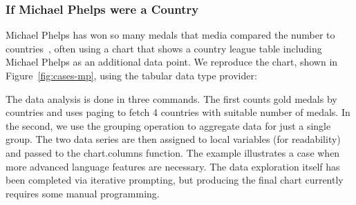 \documentclass[manuscript,review,anonymous]{acmart}
\newcommand{\kvd}[1]{\textbf{#1}}
\newcommand{\ikvd}[1]{{\fontfamily{zi4}\selectfont\small #1}}
\begin{document}
\subsubsection*{If Michael Phelps were a Country}
Michael Phelps has won so many medals that media compared the number to
countries~\cite{phelps}, often using a chart that shows a country league table including Michael Phelps
as an additional data point.
We reproduce the chart, shown in Figure~\ref{fig:cases-mp}, using the tabular data type provider:
%
%
The data analysis is done in three commands. The first counts gold medals by countries
and uses paging to fetch 4 countries with suitable number of medals. In the second, we use the
grouping operation to aggregate data for just a single group. The two data series are then assigned
to local variables (for readability) and passed to the \ikvd{chart.columns} function.
The example illustrates a case when more advanced language features are necessary. The data exploration
itself has been completed via iterative prompting, but producing the final chart currently requires
some manual programming. %


\end{document}
